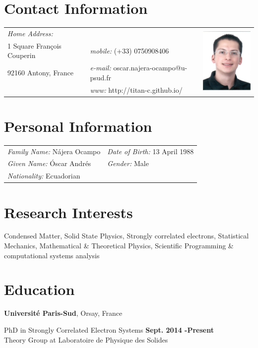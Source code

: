 \documentclass[margin,line]{res}
\newenvironment{list1}{
  \begin{list}{\ding{113}}{%
      \setlength{\itemsep}{0in}
      \setlength{\parsep}{0in} \setlength{\parskip}{0in}
      \setlength{\topsep}{0in} \setlength{\partopsep}{0in}
      \setlength{\leftmargin}{0.17in}}}{\end{list}}
\begin{document}

\begin{resume}

\section{\sc Contact Information}
  \begin{tabular}{@{}p{2in}p{2.5in}p{3cm} }
    {\it Home Address:}    &  &
      \multirow{4}{*}{ \includegraphics[width=3cm,bb=0 0 101 126]{./foto2012.jpg}}\\

    1 Square François Couperin & {\it mobile:} (+33) 0750908406 \\
    92160 Antony, France      & {\it e-mail:}  oscar.najera-ocampo@u-psud.fr\\
			      & {\it www:} http://titan-c.github.io/
  \end{tabular}\vspace{0.4cm}

\section{\sc Personal Information}
 \begin{tabular}{ll}
  {\it Family Name:} Nájera Ocampo & {\it Date of Birth:} 13 April 1988\\
  {\it Given Name:} Óscar Andrés   & {\it Gender:} Male\\
  {\it Nationality:} Ecuadorian    & %
 \end{tabular}

\section{\sc Research Interests}
  Condensed Matter, Solid State Physics, Strongly correlated electrons,
  Statistical Mechanics, Mathematical \& Theoretical Physics, Scientific
Programming \& computational systems analysis

\section{\sc Education}
  {\bf Université Paris-Sud}, Orsay, France\\
  \vspace{-.1in}
  \begin{list1}
   \item[] PhD in Strongly Correlated Electron Systems \hfill {\bf Sept. 2014
    -Present} \\
    Theory Group at Laboratoire de Physique des Solides
  \end{list1}


\end{resume}
\end{document}
